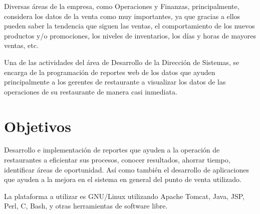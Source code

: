 Diversas áreas de la empresa, como Operaciones y Finanzas, principalmente, considera los datos de la venta como muy importantes, ya que gracias a ellos pueden saber la tendencia que siguen las ventas, el comportamiento de los nuevos productos y/o promociones, los niveles de inventarios, los días y horas de mayores ventas, etc. 

Una de las actividades del área de Desarrollo de la Dirección de Sistemas, se encarga de la programación de reportes web de los datos que ayuden principalmente a los gerentes de restaurante a visualizar los datos de las operaciones de su restaurante de manera casi inmediata.

\section*{Objetivos}
\label{sec:objetivosss}

Desarrollo e implementación de reportes que ayuden a la operación de restaurantes a eficientar sus procesos, conocer resultados, ahorrar tiempo, identificar áreas de oportunidad. Así como también el desarrollo de aplicaciones que ayuden a la mejora en el sistema en general del punto de venta utilizado.

La plataforma a utilizar es GNU/Linux utilizando Apache Tomcat, Java, JSP, Perl, C, Bash, y otras herramientas de software libre.